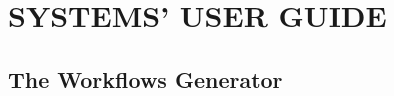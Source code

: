 \chapter{SYSTEMS' USER GUIDE}
\section{The Workflows Generator}
\label{app:workflows_generator_user_guide}